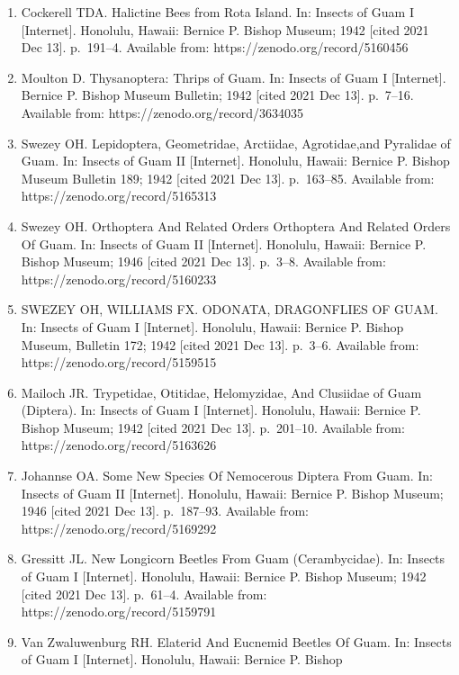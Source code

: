 \documentclass[
]{article}
\providecommand{\tightlist}{%
  \setlength{\itemsep}{0pt}\setlength{\parskip}{0pt}}
\begin{document}
\begin{enumerate}
\def\labelenumi{\arabic{enumi}.}
\tightlist
\item
  Cockerell TDA. Halictine Bees from Rota Island. In: Insects of Guam I
  {[}Internet{]}. Honolulu, Hawaii: Bernice P. Bishop Museum; 1942
  {[}cited 2021 Dec 13{]}. p.~191--4. Available from:
  https://zenodo.org/record/5160456
\item
  Moulton D. Thysanoptera: Thrips of Guam. In: Insects of Guam I
  {[}Internet{]}. Bernice P. Bishop Museum Bulletin; 1942 {[}cited 2021
  Dec 13{]}. p.~7--16. Available from: https://zenodo.org/record/3634035
\item
  Swezey OH. Lepidoptera, Geometridae, Arctiidae, Agrotidae,and
  Pyralidae of Guam. In: Insects of Guam II {[}Internet{]}. Honolulu,
  Hawaii: Bernice P. Bishop Museum Bulletin 189; 1942 {[}cited 2021 Dec
  13{]}. p.~163--85. Available from: https://zenodo.org/record/5165313
\item
  Swezey OH. Orthoptera And Related Orders Orthoptera And Related Orders
  Of Guam. In: Insects of Guam II {[}Internet{]}. Honolulu, Hawaii:
  Bernice P. Bishop Museum; 1946 {[}cited 2021 Dec 13{]}. p.~3--8.
  Available from: https://zenodo.org/record/5160233
\item
  SWEZEY OH, WILLIAMS FX. ODONATA, DRAGONFLIES OF GUAM. In: Insects of
  Guam I {[}Internet{]}. Honolulu, Hawaii: Bernice P. Bishop Museum,
  Bulletin 172; 1942 {[}cited 2021 Dec 13{]}. p.~3--6. Available from:
  https://zenodo.org/record/5159515
\item
  Mailoch JR. Trypetidae, Otitidae, Helomyzidae, And Clusiidae of Guam
  (Diptera). In: Insects of Guam I {[}Internet{]}. Honolulu, Hawaii:
  Bernice P. Bishop Museum; 1942 {[}cited 2021 Dec 13{]}. p.~201--10.
  Available from: https://zenodo.org/record/5163626
\item
  Johannse OA. Some New Species Of Nemocerous Diptera From Guam. In:
  Insects of Guam II {[}Internet{]}. Honolulu, Hawaii: Bernice P. Bishop
  Museum; 1946 {[}cited 2021 Dec 13{]}. p.~187--93. Available from:
  https://zenodo.org/record/5169292
\item
  Gressitt JL. New Longicorn Beetles From Guam (Cerambycidae). In:
  Insects of Guam I {[}Internet{]}. Honolulu, Hawaii: Bernice P. Bishop
  Museum; 1942 {[}cited 2021 Dec 13{]}. p.~61--4. Available from:
  https://zenodo.org/record/5159791
\item
  Van Zwaluwenburg RH. Elaterid And Eucnemid Beetles Of Guam. In:
  Insects of Guam I {[}Internet{]}. Honolulu, Hawaii: Bernice P. Bishop

\end{enumerate}
\end{document}

